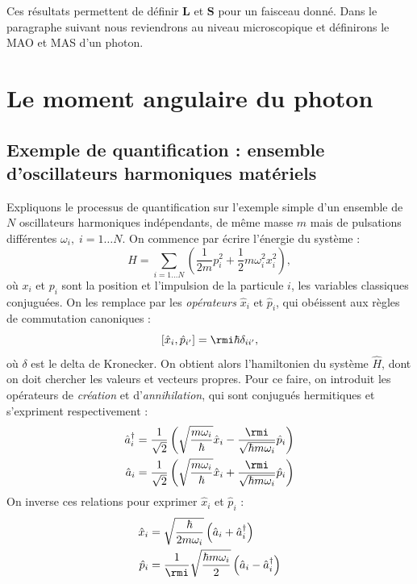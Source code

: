 Ces résultats permettent de définir $\bm{L}$ et $\bm{S}$ pour un faisceau donné. Dans le paragraphe suivant nous reviendrons au niveau microscopique et définirons le MAO et MAS d'un photon.

\section{Le moment angulaire du photon}
\subsection{Exemple de quantification : ensemble d'oscillateurs harmoniques matériels}
Expliquons le processus de quantification sur l'exemple simple d'un ensemble de $N$ oscillateurs harmoniques indépendants, de même masse $m$ mais de pulsations différentes $\omega_{i},\;i=1\ldots N$. On commence par écrire l'énergie du système :
\begin{equation}
H = \sum_{i=1\ldots N}\left(\frac{1}{2 m} p_i^2+\frac{1}{2} m \omega_i^2x_i^2\right),
\label{eq:oscharm1}
\end{equation}
où $x_i$ et $p_i$ sont la position et l'impulsion de la particule $i$, les variables classiques conjuguées. On les remplace par les \textit{opérateurs} $\hat{x}_i$ et $\hat{p}_i$, qui obéissent aux règles de commutation canoniques :
\begin{equation*}
\left[\hat{x}_i,\hat{p}_{i'}\right]=\rmi\hbar\delta_{ii'},
\end{equation*}
où $\delta$ est le delta de Kronecker. On obtient alors l'hamiltonien du système $\hat{H}$, dont on doit chercher les valeurs et vecteurs propres. Pour ce faire, on introduit les opérateurs de \textit{création} et d'\textit{annihilation}, qui sont conjugués hermitiques et s'expriment respectivement :
\begin{align*}
\hat{a}^{\dag}_{i} &= \frac{1}{\sqrt{2}}\left(\sqrt{\frac{m\omega_i}{\hbar}}\hat{x}_i-\frac{\rmi}{\sqrt{\hbar m \omega_i}}\hat{p}_{i}\right)\\
\hat{a}_{i} &= \frac{1}{\sqrt{2}}\left(\sqrt{\frac{m\omega_i}{\hbar}}\hat{x}_i+\frac{\rmi}{\sqrt{\hbar m \omega_i}}\hat{p}_{i}\right)\\
\end{align*}
On inverse ces relations pour exprimer $\hat{x}_i$ et $\hat{p}_i$ :
\begin{align*}
\hat{x}_i &= \sqrt{\frac{\hbar}{2m\omega_i}}\left(\hat{a}_{i}+\hat{a}^{\dag}_{i}\right)\\
\hat{p}_i &= \frac{1}{\rmi}\sqrt{\frac{\hbar m\omega_i}{2}}\left(\hat{a}_{i}-\hat{a}^{\dag}_{i}\right)\\
\end{align*}
